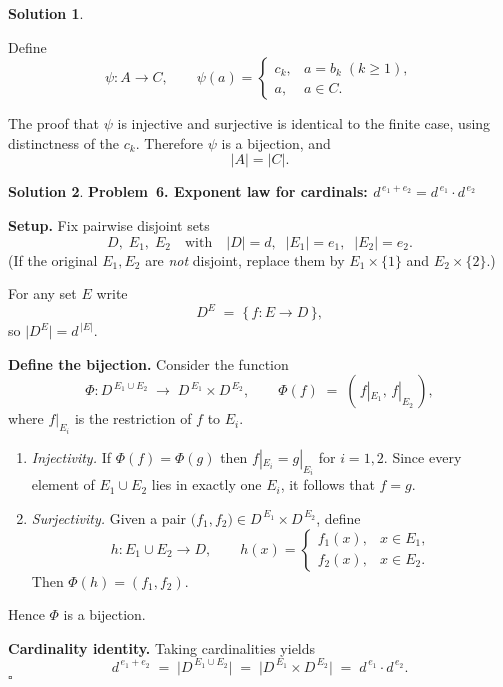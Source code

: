 \documentclass[12pt]{article}
\theoremstyle{definition} %
\newtheorem{solution}{Solution}
\theoremstyle{plain} %
\begin{document}
\begin{solution}
\begin{enumerate}[label=\textbf{(\alph*)}]
      Define
      \[
         \psi:A\longrightarrow C,
         \qquad
         \psi(a)=
         \begin{cases}
            c_{k}, & a=b_{k}\;(k\ge1),\\[4pt]
            a,     & a\in C.
         \end{cases}
      \]

      The proof that \(\psi\) is injective and surjective is identical
      to the finite case, using distinctness of the \(c_{k}\).
      Therefore \(\psi\) is a bijection, and
      \[
         \boxed{|A|=|C|}.
      \]

\end{enumerate}
\end{solution}

\begin{solution}
  \textbf{Problem 6.  Exponent law for cardinals: \(d^{\,e_1+e_2}=d^{\,e_1}\cdot d^{\,e_2}\)}
  
  \medskip
  \textbf{Setup.}
  Fix pairwise disjoint sets
  \[
     D,\;E_1,\;E_2
     \quad\text{with}\quad
     |D|=d,\;\;|E_1|=e_1,\;\;|E_2|=e_2.
  \]
  (If the original \(E_1,E_2\) are \emph{not} disjoint, replace them by
  \(E_1\times\{1\}\) and \(E_2\times\{2\}\).)
  
  For any set \(E\) write
  \[
     D^{E}\;=\;\{\,f:E\to D\,\},
  \]
  so \(\bigl|D^{E}\bigr| = d^{\,|E|}\).
  
  \medskip
  \textbf{Define the bijection.}
  Consider the function
  \[
     \Phi:
     D^{\,E_1\cup E_2}\;\longrightarrow\;
     D^{\,E_1}\times D^{\,E_2},
     \qquad
     \Phi(f) \;=\; (\,f|_{E_1},\,f|_{E_2}\,),
  \]
  where \(f|_{E_i}\) is the restriction of \(f\) to \(E_i\).
  
  \begin{enumerate}
      \item \emph{Injectivity.}
            If \(\Phi(f)=\Phi(g)\) then \(f|_{E_i}=g|_{E_i}\)
            for \(i=1,2\).
            Since every element of \(E_1\cup E_2\) lies in exactly one
            \(E_i\), it follows that \(f=g\).
      \item \emph{Surjectivity.}
            Given a pair \(\bigl(f_1,f_2\bigr)\in
            D^{\,E_1}\times D^{\,E_2}\), define
            \[
                h:E_1\cup E_2 \longrightarrow D,
                \qquad
                h(x)=
                \begin{cases}
                    f_1(x), & x\in E_1,\\[4pt]
                    f_2(x), & x\in E_2.
                \end{cases}
            \]
            Then \(\Phi(h)=(f_1,f_2)\).
  \end{enumerate}
  Hence \(\Phi\) is a bijection.
  
  \medskip
  \textbf{Cardinality identity.}
  Taking cardinalities yields
  \[
      d^{\,e_1+e_2}
      \;=\;
      \bigl|D^{\,E_1\cup E_2}\bigr|
      \;=\;
      \bigl|D^{\,E_1}\times D^{\,E_2}\bigr|
      \;=\;
      d^{\,e_1}\cdot d^{\,e_2}.
  \]
  \(\square\)
  \end{solution}
\end{document}
